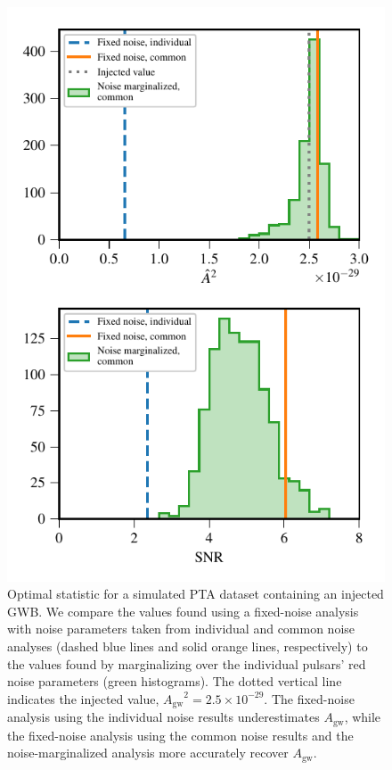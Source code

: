\documentclass[twocolumn,aps,prd,superscriptaddress]{revtex4-1}
\newcommand{\Agw}{\ensuremath{A_\mathrm{gw}}}
\begin{document}
\begin{figure}[tb]
	\includegraphics[width=0.9\columnwidth]{plots/optstat_A5e-15_dataset11.pdf}
	\caption{Optimal statistic for a simulated PTA dataset containing an injected GWB. 
			We compare the values found using a fixed-noise analysis 
			with noise parameters taken from 
			individual and common noise analyses 
			(dashed blue lines and solid orange lines, respectively) 
			to the values found by marginalizing over 
			the individual pulsars' red noise parameters (green histograms). 
			The dotted vertical line indicates the injected value, $\Agw^2 = 2.5 \times 10^{-29}$. 
			The fixed-noise analysis 
			using the individual noise results underestimates $\Agw$, 
			while the fixed-noise analysis using the common noise results 
			and the noise-marginalized analysis more accurately recover $\Agw$.}
	\label{fig:os_dataset_sample}
\end{figure}
\end{document}
